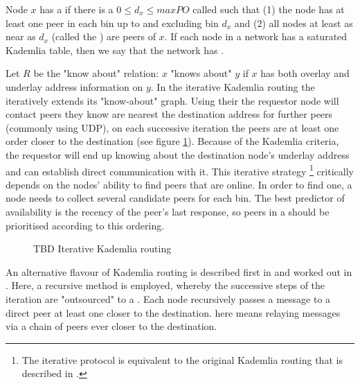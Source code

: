 Node $x$ has a  if there is a $0\leq d_x\leq \mathit{maxPO}$ called  such that (1) the node has at least one peer in each bin up to and excluding  bin $d_x$ and (2) all nodes at least as near as $d_x$ (called the ) are peers of $x$. If each node in a network has a saturated Kademlia table, then we say that the network has .

Let $R$ be the "know about" relation:  $x$ "knows about" $y$ if $x$ has both overlay and underlay address information on $y$. 
In the iterative Kademlia routing the  iteratively extends its "know-about" graph. Using their  the requestor node will contact peers they know are nearest the destination address for further peers (commonly using UDP), on each successive iteration the peers are at least one order closer to the destination (see figure \ref{fig:iterative-kademlia}). Because of the Kademlia criteria, the requestor will end up knowing about the destination node's underlay address and can establish direct communication with it. This iterative strategy%
%
\footnote{The iterative protocol is equivalent to the original Kademlia routing that is described in \cite{maymounkov2002kademlia}.
}
%
critically depends on the nodes' ability to find peers that are online. In order to find one, a node needs to collect several candidate peers for each bin. The best predictor of availability is the recency of the peer's last response, so peers in a  should be prioritised according to this ordering.

\begin{figure}[htbp]
   \centering
   \caption[Iterative Kademlia routing]{TBD Iterative Kademlia routing}
   \label{fig:iterative-kademlia}
\end{figure}


An alternative flavour of Kademlia routing is described first in \cite{heep2010r} and worked out in \cite{tronetal2019-network}. Here, a recursive method is employed, whereby the successive steps of the iteration are "outsourced" to a .
Each node recursively passes a message to a direct peer at least one  closer to the destination.  here means relaying messages via a chain of peers ever closer to the destination.

